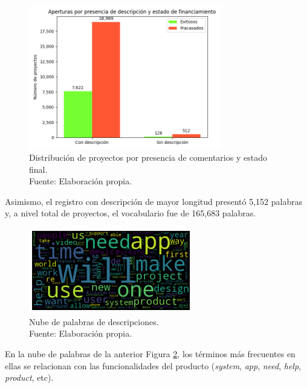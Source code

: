\begin{figure}[!ht]
	\begin{center}
		\includegraphics[width=0.75\textwidth]{4/figures/projects description by state.png}
		\caption[Distribución de proyectos por presencia de comentarios y estado final]{Distribución de proyectos por presencia de comentarios y estado final.\\
			Fuente: Elaboración propia.}
		\label{4:fig18}
	\end{center}
\end{figure}

Asimismo, el registro con descripción de mayor longitud presentó 5,152 palabras y, a nivel total de proyectos, el vocabulario fue de 165,683 palabras.

\begin{figure}[!ht]
	\begin{center}
		\includegraphics[width=0.64\textwidth]{4/figures/description_wordcloud_original_data.png}
		\caption[Nube de palabras de descripciones]{Nube de palabras de descripciones.\\
			Fuente: Elaboración propia.}
		\label{4:fig19}
	\end{center}
\end{figure}

En la nube de palabras de la anterior Figura \ref{4:fig19}, los términos más frecuentes en ellas se relacionan con las funcionalidades del producto (\textit{system}, \textit{app}, \textit{need}, \textit{help}, \textit{product}, etc).

